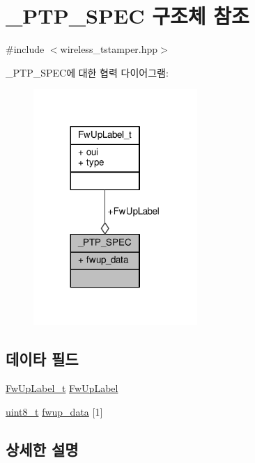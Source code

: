 \hypertarget{struct___p_t_p___s_p_e_c}{}\section{\+\_\+\+P\+T\+P\+\_\+\+S\+P\+EC 구조체 참조}
\label{struct___p_t_p___s_p_e_c}


{\ttfamily \#include $<$wireless\+\_\+tstamper.\+hpp$>$}



\+\_\+\+P\+T\+P\+\_\+\+S\+P\+E\+C에 대한 협력 다이어그램\+:
\nopagebreak
\begin{figure}[H]
\begin{center}
\leavevmode
\includegraphics[width=176pt]{struct___p_t_p___s_p_e_c__coll__graph}
\end{center}
\end{figure}
\subsection*{데이타 필드}
\begin{DoxyCompactItemize}
\item 
\hyperlink{struct_fw_up_label__t}{Fw\+Up\+Label\+\_\+t} \hyperlink{struct___p_t_p___s_p_e_c_a3180b75542044fab6e7b486623f9e8b9}{Fw\+Up\+Label}
\item 
\hyperlink{stdint_8h_aba7bc1797add20fe3efdf37ced1182c5}{uint8\+\_\+t} \hyperlink{struct___p_t_p___s_p_e_c_a0e5998c608808bb76c34bb25fa6c0da2}{fwup\+\_\+data} \mbox{[}1\mbox{]}
\end{DoxyCompactItemize}


\subsection{상세한 설명}


